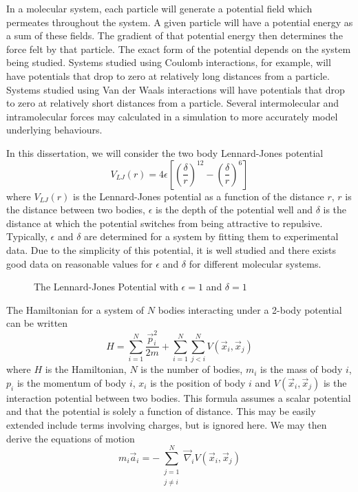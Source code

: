%
%

In a molecular system, each particle will generate a potential field
which permeates throughout the system.
%
A given particle will have a potential energy as a sum of these fields.
%
The gradient of that potential energy then determines
the force felt by that particle.
%
The exact form of the potential depends on the system being studied.
%
Systems studied using Coulomb interactions, for example,
will have potentials that drop to zero at relatively long distances
from a particle.
%
Systems studied using Van der Waals interactions will have
potentials that drop to zero at relatively short distances from
a particle.
%
Several intermolecular and intramolecular forces may
calculated in a simulation to more accurately model underlying behaviours.


In this dissertation, we will consider the two body Lennard-Jones potential
\begin{equation}
    V_{LJ}(r) = 4\epsilon \left[
        \left( \frac{\delta}{r} \right)^{12}
        - \left( \frac{\delta}{r} \right)^{6}
    \right]
\end  {equation}
where $V_{LJ}(r)$ is the Lennard-Jones potential as
a function of the distance $r$,
$r$ is the distance between two bodies,
$\epsilon$ is the depth of the potential well and
$\delta$ is the distance at which
the potential switches from being attractive to repulsive.
Typically, $\epsilon$ and $\delta$ are determined for a system by
fitting them to experimental data.
%
Due to the simplicity of this potential,
it is well studied and there exists good data on
reasonable values for $\epsilon$ and $\delta$ for
different molecular systems.
%
\begin{figure}
    
    \caption{The Lennard-Jones Potential with $\epsilon = 1$ and $\delta = 1$}
\end  {figure}


The Hamiltonian for a system of $N$ bodies
interacting under a 2-body potential can be written
\begin{equation}
    H = \sum_{i=1}^N \frac{\vec{p}_i^2}{2 m}
        + \sum_{i=1}^N \sum_{j<i}^N V(\vec{x}_i, \vec{x}_j)
\end  {equation}
where $H$ is the Hamiltonian,
$N$ is the number of bodies,
$m_i$ is the mass of body $i$,
$p_i$ is the momentum of body $i$,
$x_i$ is the position of body $i$ and
$V(\vec{x}_i, \vec{x}_j)$ is the interaction potential between two bodies.
This formula assumes a scalar potential and
that the potential is solely a function of distance.
%
This may be easily extended include terms involving charges,
but is ignored here.
%
We may then derive the equations of motion
\begin{equation}
    m_i \vec{a}_i = -\sum_{\substack{j=1\\j\ne{}i}}^N
                    \vec{\nabla}_i V(\vec{x}_i, \vec{x}_j)
\end  {equation}


